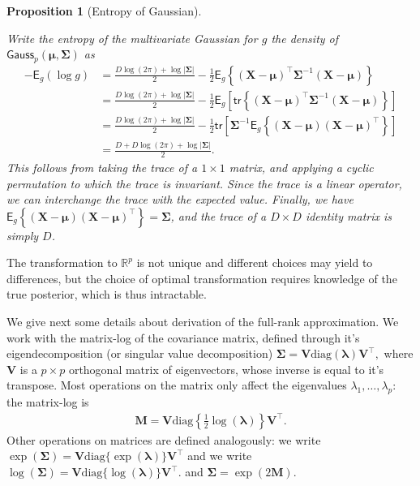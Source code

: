 \documentclass[
  11pt,
  letterpaper,
]{scrbook}
\theoremstyle{definition}
\theoremstyle{plain}
\newtheorem{proposition}{Proposition}[chapter]
\theoremstyle{plain}
\theoremstyle{plain}
\theoremstyle{definition}
\theoremstyle{definition}
\theoremstyle{plain}
\newtheorem{proposition}{Proposition}[chapter]
\theoremstyle{plain}
\theoremstyle{remark}
\begin{document}
\begin{proposition}[Entropy of
Gaussian]\protect\hypertarget{prp-entropy-Gauss}{}\label{prp-entropy-Gauss}

Write the entropy of the multivariate Gaussian for \(g\) the density of
\(\mathsf{Gauss}_p(\boldsymbol{\mu}, \boldsymbol{\Sigma})\) as
\begin{align*}
 - \mathsf{E}_g(\log g) &= \frac{D\log(2\pi) + \log|\boldsymbol{\Sigma}|}{2} - \frac{1}{2}\mathsf{E}_g\left\{ (\boldsymbol{X}-\boldsymbol{\mu})^\top\boldsymbol{\Sigma}^{-1}(\boldsymbol{X}-\boldsymbol{\mu})\right\} \\& = \frac{D\log(2\pi) + \log|\boldsymbol{\Sigma}|}{2} - \frac{1}{2}\mathsf{E}_g\left[ \mathsf{tr}\left\{(\boldsymbol{X}-\boldsymbol{\mu})^\top\boldsymbol{\Sigma}^{-1}(\boldsymbol{X}-\boldsymbol{\mu})\right\}\right]
 \\& =  \frac{D\log(2\pi) + \log|\boldsymbol{\Sigma}|}{2} - \frac{1}{2}\mathsf{tr}\left[\boldsymbol{\Sigma}^{-1}\mathsf{E}_g\left\{(\boldsymbol{X}-\boldsymbol{\mu})(\boldsymbol{X}-\boldsymbol{\mu})^\top\right\}\right]
 \\& =\frac{D+D\log(2\pi) + \log |\boldsymbol{\Sigma}|}{2}.
\end{align*} This follows from taking the trace of a \(1\times 1\)
matrix, and applying a cyclic permutation to which the trace is
invariant. Since the trace is a linear operator, we can interchange the
trace with the expected value. Finally, we have
\(\mathsf{E}_g\left\{(\boldsymbol{X}-\boldsymbol{\mu})(\boldsymbol{X}-\boldsymbol{\mu})^\top\right\}=\boldsymbol{\Sigma}\),
and the trace of a \(D \times D\) identity matrix is simply \(D\).

\end{proposition}

The transformation to \(\mathbb{R}^p\) is not unique and different
choices may yield to differences, but the choice of optimal
transformation requires knowledge of the true posterior, which is thus
intractable.

We give next some details about derivation of the full-rank
approximation. We work with the matrix-log of the covariance matrix,
defined through it's eigendecomposition (or singular value
decomposition)
\(\boldsymbol{\Sigma}=\mathbf{V}\mathrm{diag}(\boldsymbol{\lambda})\mathbf{V}^{\top},\)
where \(\mathbf{V}\) is a \(p\times p\) orthogonal matrix of
eigenvectors, whose inverse is equal to it's transpose. Most operations
on the matrix only affect the eigenvalues
\(\lambda_1, \ldots, \lambda_p\): the matrix-log is \begin{align*}
\mathbf{M} =\mathbf{V}\mathrm{diag}\left\{ \frac{1}{2}\log(\boldsymbol{\lambda})\right\}\mathbf{V}^\top.
\end{align*} Other operations on matrices are defined analogously: we
write
\(\exp(\boldsymbol{\Sigma}) = \mathbf{V}\mathrm{diag}\{ \exp(\boldsymbol{\lambda})\}\mathbf{V}^\top\)
and we write
\(\log(\boldsymbol{\Sigma}) = \mathbf{V}\mathrm{diag}\{ \log(\boldsymbol{\lambda})\}\mathbf{V}^\top\).
and \(\boldsymbol{\Sigma} = \exp(2\mathbf{M})\).
\end{document}
